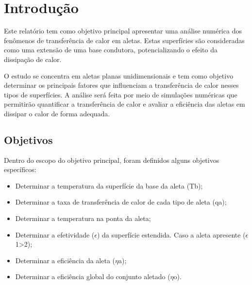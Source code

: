 \chapter{Introdução}\label{cap:introducao}

Este relatório tem como objetivo principal apresentar uma análise numérica dos fenômenos de transferência de calor em aletas. Estas superfícies são consideradas como uma extensão de uma base condutora, potencializando o efeito da dissipação de calor.

O estudo se concentra em aletas planas unidimensionais e tem como objetivo determinar os principais fatores que influenciam a transferência de calor nesses tipos de superfícies. A análise será feita por meio de simulações numéricas que permitirão quantificar a transferência de calor e avaliar a eficiência das aletas em dissipar o calor de forma adequada.

\section{Objetivos}

Dentro do escopo do objetivo principal, foram definidos alguns objetivos específicos:

\begin{itemize}[leftmargin=2cm]
   \item Determinar a temperatura da superfície da base da aleta (Tb);

   \item Determinar a taxa de transferência de calor de cada tipo de aleta (qa);

   \item Determinar a temperatura na ponta da aleta;

   \item Determinar a efetividade ({\large \(\epsilon\)}) da superfície estendida. Caso a aleta apresente ({\large\(\epsilon\)}1>2);

   \item Determinar a eficiência da aleta ({\large\(\eta\)}a);

   \item Determinar a eficiência global do conjunto aletado ({\large\({\eta}\)}o).
\end{itemize}
